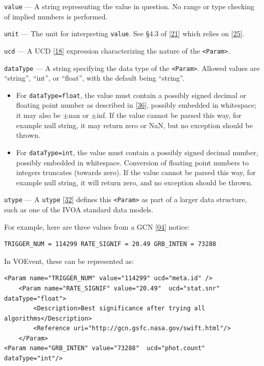 \documentclass[11pt,a4paper]{ivoa}
\begin{document}
 {\tt value}\label{sec:3.3.1.2} --- A string representing the value in question. No range or type checking of implied numbers is performed. 

 {\tt unit}\label{sec:3.3.1.3} --- The unit for interpreting {\tt value}. See \S4.3 of [\hyperref[bib21]{21}]
which relies on [\hyperref[bib25]{25}]. 

 {\tt ucd}\label{sec:3.3.1.4} --- A UCD [\hyperref[bib18]{18}]
expression characterizing the nature of the {\tt <Param>}. 

 {\tt dataType}\label{sec:3.3.1.5} --- A string specifying the data type of the {\tt <Param>}. Allowed values are ``string'', ``int'', or ``float'', with the default being ``string''. 
\begin{itemize}
\item For {\tt dataType=float}, the value must contain a possibly signed decimal or floating point number as described in [\hyperref[bib36]{36}], possibly embedded in whitespace; it may also be $\pm$nan or $\pm$inf. If the value cannot be parsed this way, for example null string, it may return zero or NaN, but no exception should be thrown.
\item For {\tt dataType=int}, the value must contain a possibly signed decimal number, possibly embedded in whitespace. Conversion of floating point numbers to integers truncates (towards zero). If the value cannot be parsed this way, for example null string, it will return zero, and no exception should be thrown.
\end{itemize}

 {\tt utype}\label{sec:3.3.1.6} --- A {\tt utype} [\hyperref[bib32]{32}] defines this {\tt <Param>} as part of a larger data structure, such as one of the IVOA standard data models. 

For example, here are three values from a GCN [\hyperref[bib04]{04}] notice: 
{\footnotesize
\begin{verbatim}
TRIGGER_NUM = 114299 RATE_SIGNIF = 20.49 GRB_INTEN = 73288 
\end{verbatim}}
In VOEvent, these can be represented as: 
{\footnotesize
\begin{verbatim}
<Param name="TRIGGER_NUM" value="114299" ucd="meta.id" />
    <Param name="RATE_SIGNIF" value="20.49"  ucd="stat.snr" dataType="float">
        <Description>Best significance after trying all algorithms</Description>
        <Reference uri="http://gcn.gsfc.nasa.gov/swift.html"/>
    </Param>
<Param name="GRB_INTEN" value="73288"  ucd="phot.count" dataType="int"/> 
\end{verbatim}}
\end{document}
